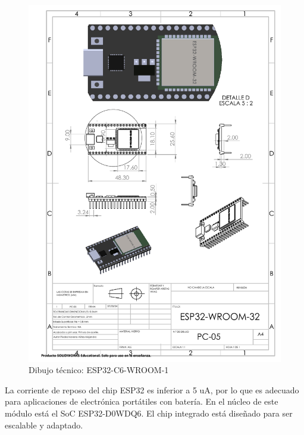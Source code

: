     \begin{figure}[H]
        \centering
        \includegraphics[trim = {22mm 120mm 22mm 85mm},clip,scale=0.4]{22/Img/esp32Dibujo.pdf}
        \caption{Dibujo técnico: ESP32-C6-WROOM-1}
        \label{fig:esp}
    \end{figure}
    
    La corriente de reposo del chip ESP32 es inferior a 5 uA, por lo que es adecuado para aplicaciones de electrónica portátiles con batería. En el núcleo de este módulo está el SoC ESP32-D0WDQ6. El chip integrado está diseñado para ser escalable y adaptado.
    
